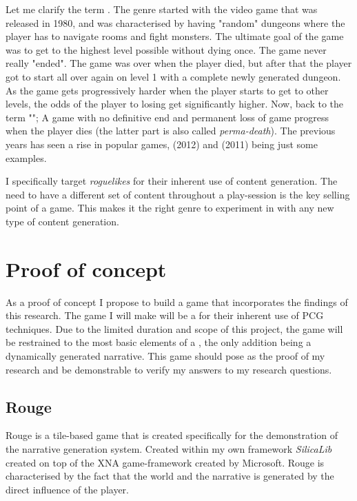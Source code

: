 Let me clarify the term \rogue. The genre started with the video game  that was released in 1980, and was characterised by having "random" dungeons where the player has to navigate rooms and fight monsters. The ultimate goal of the game was to get to the highest level possible without dying once. The game never really "ended". The game was over when the player died, but after that the player got to start all over again on level 1 with a complete newly generated dungeon. As the game gets progressively harder when the player starts to get to other levels, the odds of the player to losing get significantly higher. Now, back to the term "\rogue"; A game with no definitive end and permanent loss of game progress when the player dies (the latter part is also called \textit{perma-death}). The previous years has seen a rise in popular \rogue games,  (2012) and  (2011) being just some examples.

I specifically target \textit{roguelikes} for their inherent use of content generation. The need to have a different set of content throughout a play-session is the key selling point of a \rogue game. This makes it the right genre to experiment in with any new type of content generation.
\section{Proof of concept}
As a proof of concept I propose to build a game that incorporates the findings of this research. The game I will make will be a \rogue for their inherent use of PCG techniques. Due to the limited duration and scope of this project, the game will be restrained to the most basic elements of a \rogue, the only addition being a dynamically generated narrative. This game should pose as the proof of my research and be demonstrable to verify my answers to my research questions.
\subsection{Rouge}
Rouge is a \rogue tile-based game that is created specifically for the demonstration of the \diage narrative generation system.
Created within my own framework \textit{SilicaLib} created on top of the XNA game-framework created by Microsoft.
Rouge is characterised by the fact that the world and the narrative is generated by the direct influence of the player.

